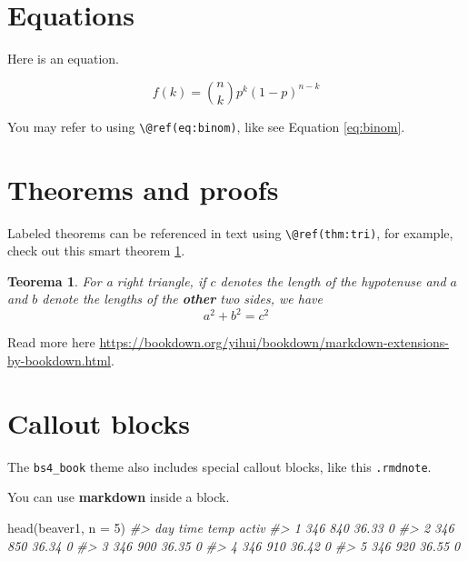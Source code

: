 \documentclass[
]{book}
\newenvironment{Shaded}{\begin{snugshade}}{\end{snugshade}}
\newcommand{\AttributeTok}[1]{\textcolor[rgb]{0.77,0.63,0.00}{#1}}
\newcommand{\CommentTok}[1]{\textcolor[rgb]{0.56,0.35,0.01}{\textit{#1}}}
\newcommand{\DecValTok}[1]{\textcolor[rgb]{0.00,0.00,0.81}{#1}}
\newcommand{\FunctionTok}[1]{\textcolor[rgb]{0.00,0.00,0.00}{#1}}
\newcommand{\NormalTok}[1]{#1}
\newtheorem{theorem}{Teorema}[chapter]
\theoremstyle{definition}
\theoremstyle{definition}
\theoremstyle{definition}
\theoremstyle{definition}
\theoremstyle{remark}
\begin{document}
\hypertarget{equations}{%
\section{Equations}\label{equations}}

Here is an equation.

\begin{equation} 
  f\left(k\right) = \binom{n}{k} p^k\left(1-p\right)^{n-k}
  \label{eq:binom}
\end{equation}

You may refer to using \texttt{\textbackslash{}@ref(eq:binom)}, like see Equation \eqref{eq:binom}.

\hypertarget{theorems-and-proofs}{%
\section{Theorems and proofs}\label{theorems-and-proofs}}

Labeled theorems can be referenced in text using \texttt{\textbackslash{}@ref(thm:tri)}, for example, check out this smart theorem \ref{thm:tri}.

\begin{theorem}
\protect\hypertarget{thm:tri}{}\label{thm:tri}For a right triangle, if \(c\) denotes the \emph{length} of the hypotenuse
and \(a\) and \(b\) denote the lengths of the \textbf{other} two sides, we have
\[a^2 + b^2 = c^2\]
\end{theorem}

Read more here \url{https://bookdown.org/yihui/bookdown/markdown-extensions-by-bookdown.html}.

\hypertarget{callout-blocks}{%
\section{Callout blocks}\label{callout-blocks}}

The \texttt{bs4\_book} theme also includes special callout blocks, like this \texttt{.rmdnote}.

You can use \textbf{markdown} inside a block.

\begin{Shaded}
\begin{Highlighting}[]
\FunctionTok{head}\NormalTok{(beaver1, }\AttributeTok{n =} \DecValTok{5}\NormalTok{)}
\CommentTok{\#\textgreater{}   day time  temp activ}
\CommentTok{\#\textgreater{} 1 346  840 36.33     0}
\CommentTok{\#\textgreater{} 2 346  850 36.34     0}
\CommentTok{\#\textgreater{} 3 346  900 36.35     0}
\CommentTok{\#\textgreater{} 4 346  910 36.42     0}
\CommentTok{\#\textgreater{} 5 346  920 36.55     0}
\end{Highlighting}
\end{Shaded}
\end{document}
